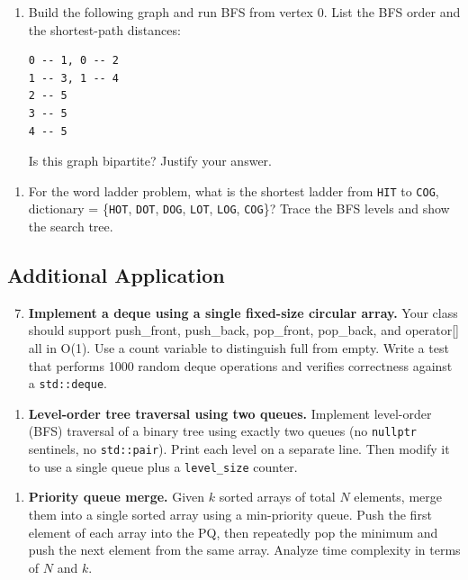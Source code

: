 \begin{enumerate}
\item Build the following graph and run BFS from vertex 0. List the BFS order and the shortest-path distances:
\begin{verbatim}
0 -- 1, 0 -- 2
1 -- 3, 1 -- 4
2 -- 5
3 -- 5
4 -- 5
\end{verbatim}
Is this graph bipartite? Justify your answer.
\end{enumerate}

\begin{enumerate}
\item For the word ladder problem, what is the shortest ladder from \texttt{HIT} to \texttt{COG}, dictionary = \{\texttt{HOT}, \texttt{DOT}, \texttt{DOG}, \texttt{LOT}, \texttt{LOG}, \texttt{COG}\}? Trace the BFS levels and show the search tree.
\end{enumerate}

\subsection{Additional Application}

\begin{enumerate}
\setcounter{enumi}{6}
\item \textbf{Implement a deque using a single fixed-size circular array.} Your class should support push\_front, push\_back, pop\_front, pop\_back, and operator[] all in O(1). Use a count variable to distinguish full from empty. Write a test that performs 1000 random deque operations and verifies correctness against a \texttt{std::deque}.
\end{enumerate}

\begin{enumerate}
\item \textbf{Level-order tree traversal using two queues.} Implement level-order (BFS) traversal of a binary tree using exactly two queues (no \texttt{nullptr} sentinels, no \texttt{std::pair}). Print each level on a separate line. Then modify it to use a single queue plus a \texttt{level\_size} counter.
\end{enumerate}

\begin{enumerate}
\item \textbf{Priority queue merge.} Given $k$ sorted arrays of total $N$ elements, merge them into a single sorted array using a min-priority queue. Push the first element of each array into the PQ, then repeatedly pop the minimum and push the next element from the same array. Analyze time complexity in terms of $N$ and $k$.
\end{enumerate}

